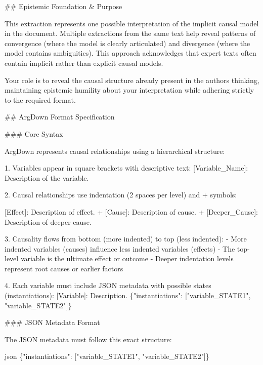 \documentclass[
  11pt,
  letterpaper,
]{book}
\newenvironment{Shaded}{\begin{snugshade}}{\end{snugshade}}
\newcommand{\StringTok}[1]{\textcolor[rgb]{0.13,0.47,0.30}{#1}}
\begin{document}
\begin{landscape}
\begin{Shaded}
\begin{Highlighting}[]
\StringTok{\#\# Epistemic Foundation \& Purpose}

\StringTok{This extraction represents one possible interpretation of the implicit causal}
\StringTok{model in the document. Multiple extractions from the same text help reveal}
\StringTok{patterns of convergence (where the model is clearly articulated) and}
\StringTok{divergence (where the model contains ambiguities). This approach acknowledges}
\StringTok{that expert texts often contain implicit rather than explicit causal models.}

\StringTok{Your role is to reveal the causal structure already present in the author\textquotesingle{}s}
\StringTok{thinking, maintaining epistemic humility about your interpretation while}
\StringTok{adhering strictly to the required format.}

\StringTok{\#\# ArgDown Format Specification}

\StringTok{\#\#\# Core Syntax}

\StringTok{ArgDown represents causal relationships using a hierarchical structure:}

\StringTok{1. Variables appear in square brackets with descriptive text:}
\StringTok{   \textasciigrave{}[Variable\_Name]: Description of the variable.\textasciigrave{}}

\StringTok{2. Causal relationships use indentation (2 spaces per level) and \textquotesingle{}+\textquotesingle{} symbols:}

\StringTok{[Effect]: Description of effect. + [Cause]: Description of cause. + [Deeper\_Cause]: Description of deeper cause.}

\StringTok{3. Causality flows from bottom (more indented) to top (less indented):}
\StringTok{{-} More indented variables (causes) influence less indented variables (effects)}
\StringTok{{-} The top{-}level variable is the ultimate effect or outcome}
\StringTok{{-} Deeper indentation levels represent root causes or earlier factors}

\StringTok{4. Each variable must include JSON metadata with possible states (instantiations):}
\StringTok{\textasciigrave{}[Variable]: Description. \{"instantiations": ["variable\_STATE1", "variable\_STATE2"]\}\textasciigrave{}}

\StringTok{\#\#\# JSON Metadata Format}

\StringTok{The JSON metadata must follow this exact structure:}

\StringTok{\textasciigrave{}\textasciigrave{}\textasciigrave{}json}
\StringTok{\{"instantiations": ["variable\_STATE1", "variable\_STATE2"]\}}


\end{Highlighting}
\end{Shaded}
\end{landscape}
\end{document}
